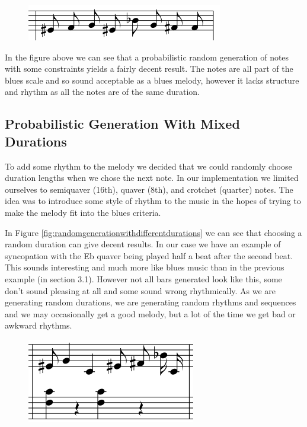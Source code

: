 \documentclass[pdftex,12pt,a4paper]{report}
\begin{document}
\begin{figure}[here]
  \centering
  \includegraphics[scale=0.7]{figure/randomgeneration.png}
  \label{fig:probabilisticgeneration}
\end{figure}

In the figure above we can see that a probabilistic random generation of notes with some constraints yields a fairly decent result. The notes are all part of the blues scale and so sound acceptable as a blues melody, however it lacks structure and rhythm as all the notes are of the same duration. 

\subsection{Probabilistic Generation With Mixed Durations}
To add some rhythm to the melody we decided that we could randomly choose duration lengths when we chose the next note. In our implementation we limited ourselves to semiquaver (16th), quaver (8th), and crotchet (quarter) notes. The idea was to introduce some style of rhythm to the music in the hopes of trying to make the melody fit into the blues criteria.

In Figure \ref{fig:randomgenerationwithdifferentdurations} we can see that choosing a random duration can give decent results. In our case we have an example of syncopation with the Eb quaver being played half a beat after the second beat. This sounds interesting and much more like blues music than in the previous example (in section 3.1). However not all bars generated look like this, some don't sound pleasing at all and some sound wrong rhythmically. As we are generating random durations, we are generating random rhythms and sequences and we may occasionally get a good melody, but a lot of the time we get bad or awkward rhythms. 

\begin{figure}[here]
  \centering
  \includegraphics[scale=0.6]{figure/randomgenerationdifferentdurations.png}
  \label{fig:probabilisticgenerationwithdifferentdurations}
\end{figure}
\end{document}
